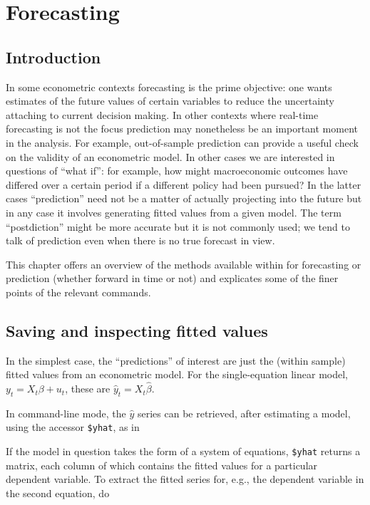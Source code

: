 \chapter{Forecasting}
\label{chap-forecast}

\section{Introduction}
\label{sec:fcast-intro}

In some econometric contexts forecasting is the prime objective: one
wants estimates of the future values of certain variables to reduce
the uncertainty attaching to current decision making.  In other
contexts where real-time forecasting is not the focus prediction
may nonetheless be an important moment in the analysis.  For example,
out-of-sample prediction can provide a useful check on the validity of
an econometric model.  In other cases we are interested in questions
of ``what if'': for example, how might macroeconomic outcomes have
differed over a certain period if a different policy had been pursued?
In the latter cases ``prediction'' need not be a matter of actually
projecting into the future but in any case it involves generating
fitted values from a given model.  The term ``postdiction'' might be
more accurate but it is not commonly used; we tend to talk of
prediction even when there is no true forecast in view.

This chapter offers an overview of the methods available within
 for forecasting or prediction (whether forward in time or
not) and explicates some of the finer points of the relevant commands.

\section{Saving and inspecting fitted values}
\label{sec:fcast-fitted}

In the simplest case, the ``predictions'' of interest are just the
(within sample) fitted values from an econometric model.  For the
single-equation linear model, $y_t = X_t \beta + u_t$, these are
$\hat{y}_t = X_t \hat{\beta}$.  

In command-line mode, the $\hat{y}$ series can be retrieved, after
estimating a model, using the accessor \verb|$yhat|, as in
%
% 
If the model in question takes the form of a system of equations,
\verb|$yhat| returns a matrix, each column of which contains the
fitted values for a particular dependent variable.  To extract
the fitted series for, e.g., the dependent variable in the second
equation, do
%


